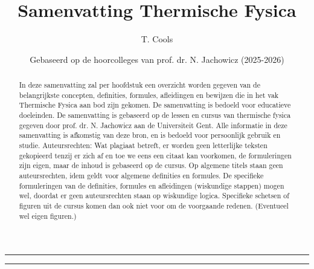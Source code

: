 \documentclass[a4paper,twoside]{article}
\title{Samenvatting Thermische Fysica}
\author{T. Cools}
\date{Gebaseerd op de hoorcolleges van prof. dr. N. Jachowicz (2025-2026)}
\theoremstyle{definition}
\begin{document}
\maketitle
\hrule
\begin{abstract}
    In deze samenvatting zal per hoofdstuk een overzicht worden gegeven van de belangrijkste concepten, definities, formules, afleidingen en bewijzen die in het vak Thermische Fysica aan bod zijn gekomen.
    De samenvatting is bedoeld voor educatieve doeleinden.
    De samenvatting is gebaseerd op de lessen en cursus van thermische fysica gegeven door prof. dr. N. Jachowicz aan de Universiteit Gent. Alle informatie in deze samenvatting is afkomstig van deze bron, en is bedoeld voor persoonlijk gebruik en studie.
    \medskip
    Auteursrechten: 
    \medskip
    Wat plagiaat betreft, er worden geen letterlijke teksten gekopieerd tenzij er zich af en toe we eens een citaat kan voorkomen, de formuleringen zijn eigen, maar de inhoud is gebaseerd op de cursus. Op algemene titels staan geen auteursrechten, idem geldt voor algemene definities en formules.
    De specifieke formuleringen van de definities, formules en afleidingen (wiskundige stappen) mogen wel, doordat er geen auteursrechten staan op wiskundige logica. Specifieke schetsen of figuren uit de cursus komen dan ook niet voor om de voorgaande redenen. (Eventueel wel eigen figuren.)
\end{abstract}
\hrule










\end{document}
